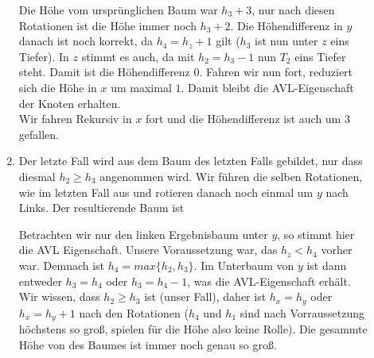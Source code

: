 \documentclass[11pt,a4paper,ngerman]{article}
\begin{document}
\begin{description}
\begin{enumerate}[1. {Fall:}]
      Die Höhe vom ursprünglichen Baum war $h_3 + 3$, nur nach diesen Rotationen ist die Höhe immer noch $h_3 + 2$. Die Höhendifferenz in $y$ danach ist noch
      korrekt, da $h_4 = h_z + 1$ gilt ($h_3$ ist nun unter $z$ eins Tiefer).
      In $z$ stimmt es auch, da mit $h_2 = h_3 - 1$ nun $T_2$ eins Tiefer steht. Damit ist die Höhendifferenz $0$. Fahren wir nun fort, reduziert sich die Höhe
      in $x$ um maximal $1$. Damit bleibt die AVL-Eigenschaft der Knoten erhalten.\\

      Wir fahren Rekursiv in $x$ fort und die Höhendifferenz ist auch um $3$ gefallen.

      \item Der letzte Fall wird aus dem Baum des letzten Falls gebildet, nur dass diesmal $h_2 \geq h_3$ angenommen wird. Wir führen die selben Rotationen,
         wie im letzten Fall aus und rotieren danach noch einmal um $y$ nach Links. Der resultierende Baum ist

      \begin{center}
      \end{center}

      Betrachten wir nur den linken Ergebnisbaum unter $y$, so stimmt hier die AVL Eigenschaft. Unsere Voraussetzung war, das $h_z < h_4$ vorher war. Demnach ist
      $h_4 = max\{ h_2, h_3 \}$. Im Unterbaum von $y$ ist dann entweder $h_3 = h_4$ oder $h_3 = h_4 - 1$, was die AVL-Eigenschaft erhält.\\
   
      Wir wissen, dass $h_2 \geq h_3$ ist (unser Fall), daher ist $h_x = h_y$ oder $h_x = h_y +1$ nach den Rotationen ($h_4$ und $h_1$ sind nach Vorraussetzung höchstens so groß, spielen
      für die Höhe also keine Rolle). Die gesammte Höhe von des Baumes ist immer noch genau so groß.


\end{enumerate}
\end{description}
\end{document}
